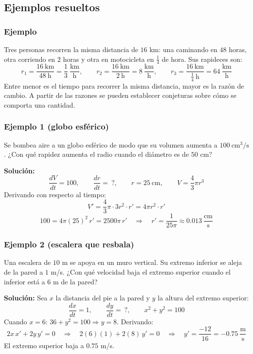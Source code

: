 \documentclass[12pt]{article}
\begin{document}
\subsection{Ejemplos resueltos}

\subsubsection{Ejemplo}


Tres personas recorren la misma distancia de $16$ km: una caminando en $48$ horas, otra corriendo en $2$ horas y otra en motocicleta en $\frac{1}{4}$ de hora. Sus rapideces son:
\[
r_1 = \frac{16\ \text{km}}{48\ \text{h}} = \frac{1}{3}\ \frac{\text{km}}{\text{h}}, \qquad
r_2 = \frac{16\ \text{km}}{2\ \text{h}} = 8\ \frac{\text{km}}{\text{h}}, \qquad
r_3 = \frac{16\ \text{km}}{\frac{1}{4}\ \text{h}} = 64\ \frac{\text{km}}{\text{h}}
\]
Entre menor es el tiempo para recorrer la misma distancia, mayor es la razón de cambio. A partir de las razones se pueden establecer conjeturas sobre cómo se comporta una cantidad.



\subsubsection{Ejemplo 1 (globo esférico)}


Se bombea aire a un globo esférico de modo que su volumen aumenta a $100\ \text{cm}^3/\text{s}$. ¿Con qué rapidez aumenta el radio cuando el diámetro es de $50$ cm?

\textbf{Solución:}
\[
\frac{dV}{dt} = 100, \qquad \frac{dr}{dt} = \ ?, \qquad r = 25\ \text{cm}, \qquad V = \frac{4}{3}\pi r^3
\]
Derivando con respecto al tiempo:
\[
V' = \frac{4}{3}\pi \cdot 3r^2 \cdot r' = 4\pi r^2 \cdot r'
\]
\[
100 = 4\pi (25)^2 \, r' = 2500\pi \, r' \quad \Rightarrow \quad r' = \frac{1}{25\pi} \approx 0.013\ \frac{\text{cm}}{\text{s}}
\]



\subsubsection{Ejemplo 2 (escalera que resbala)}


Una escalera de $10$ m se apoya en un muro vertical. Su extremo inferior se aleja de la pared a $1$ m/s. ¿Con qué velocidad baja el extremo superior cuando el inferior está a $6$ m de la pared?

\textbf{Solución:} Sea $x$ la distancia del pie a la pared y $y$ la altura del extremo superior:
\[
\frac{dx}{dt} = 1, \qquad \frac{dy}{dt} = \ ?, \qquad x^2 + y^2 = 100
\]
Cuando $x = 6$: $36 + y^2 = 100 \Rightarrow y = 8$. Derivando:
\[
2x\,x' + 2y\,y' = 0 \quad \Rightarrow \quad 2(6)(1) + 2(8)\,y' = 0 \quad \Rightarrow \quad y' = \frac{-12}{16} = -0.75\ \frac{\text{m}}{\text{s}}
\]
El extremo superior baja a $0.75$ m/s.
\end{document}
